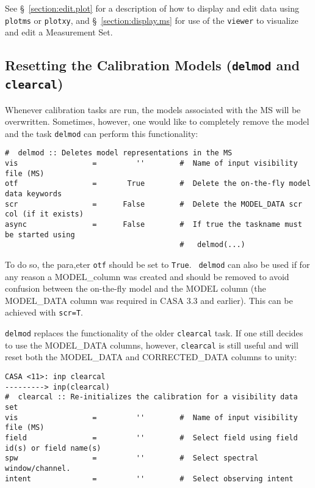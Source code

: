 See \S~\ref{section:edit.plot} for a description of how to display and edit 
data using {\tt plotms} or {\tt plotxy}, and \S~\ref{section:display.ms} for use of
the {\tt viewer} to visualize and edit a Measurement Set.

\subsection{Resetting the Calibration Models ({\tt delmod} and {\tt clearcal})}
\label{section:cal.correct.clearcal}

Whenever calibration tasks are run, the models associated with the MS
will be overwritten. Sometimes, however, one would like to completely
remove the model and the task {\tt delmod} can perform this
functionality:

\small
\begin{verbatim}
#  delmod :: Deletes model representations in the MS
vis                 =         ''        #  Name of input visibility file (MS)
otf                 =       True        #  Delete the on-the-fly model data keywords
scr                 =      False        #  Delete the MODEL_DATA scr col (if it exists)
async               =      False        #  If true the taskname must be started using
                                        #   delmod(...)
\end{verbatim} 

To do so, the para,eter {\tt otf} should be set to {\tt True}. {\tt
  delmod} can also be used if for any reason a MODEL\_column was
created and should be removed to avoid confusion between the
on-the-fly model and the MODEL column (the MODEL\_DATA column was
required in CASA 3.3 and earlier). This can be achieved with {\tt scr=T}.


{\tt delmod} replaces the functionality of the older {\tt clearcal}
task. If one still decides to use the MODEL\_DATA columns, however,
{\tt clearcal} is still useful and will reset both the MODEL\_DATA and
CORRECTED\_DATA columns to unity:

\small
\begin{verbatim}
CASA <11>: inp clearcal
---------> inp(clearcal)
#  clearcal :: Re-initializes the calibration for a visibility data set
vis                 =         ''        #  Name of input visibility file (MS)
field               =         ''        #  Select field using field id(s) or field name(s)
spw                 =         ''        #  Select spectral window/channel.
intent              =         ''        #  Select observing intent

\end{verbatim}
\normalsize

